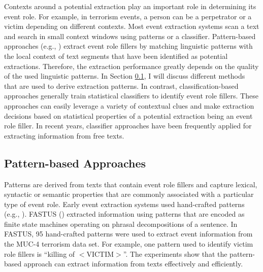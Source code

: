 Contexts around a potential extraction play an important role in 
determining its event role. 
For example, in terrorism events, a person can be a 
perpetrator or a victim depending on different contexts. 
Most event extraction systems scan a text and search in small context
windows using patterns or a classifier.
Pattern-based approaches (e.g., \cite{hobbs93,palka93,autoslog-aaai93})
extract event role fillers by matching linguistic patterns with 
the local context of text segments that 
have been identified as potential extractions. 
Therefore, %
the extraction performance greatly depends on 
the quality of the used linguistic patterns. 
In Section \ref{related:pattern}, 
I will discuss different methods that are used to derive extraction patterns.
In contrast, classification-based approaches 
generally train statistical classifiers to 
identify event role fillers. 
These approaches can easily leverage a variety of contextual clues 
and make extraction decisions based on 
statistical properties 
of a potential extraction being an event role filler. 
In recent years, 
classifier approaches have been  
frequently applied for extracting information 
from free texts. 


\subsection{Pattern-based Approaches}
\label{related:pattern}
Patterns are derived from texts that contain event role fillers 
and capture lexical, syntactic or semantic properties that 
are commonly associated with a particular type of event role. 
Early event extraction 
systems used hand-crafted patterns (e.g., \cite{hobbs93,muc3-system}). 
FASTUS (\cite{hobbs93}) 
extracted information using 
patterns that are encoded as finite state machines operating on 
phrasal decompositions of a sentence. 
In FASTUS, 95 hand-crafted patterns were used to extract event information 
from the MUC-4 terrorism data set. For example, one pattern used to identify 
victim role fillers is ``killing of $<$VICTIM$>$''.
The experiments show that 
the pattern-based approach 
can extract information from texts effectively and efficiently. 

